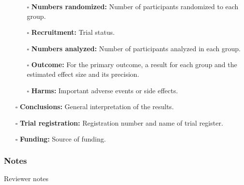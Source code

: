 \documentclass[11pt]{article}
\def\tightlist{}
\begin{document}
\begin{Form}
\begin{itemize}
  \begin{itemize}
  \tightlist
  \item[$\square$]
    \textbf{Numbers randomized:} Number of participants randomized to
    each group.
  \item[$\square$]
    \textbf{Recruitment:} Trial status.
  \item[$\square$]
    \textbf{Numbers analyzed:} Number of participants analyzed in each
    group.
  \item[$\square$]
    \textbf{Outcome:} For the primary outcome, a result for each group
    and the estimated effect size and its precision.
  \item[$\square$]
    \textbf{Harms:} Important adverse events or side effects.
  \end{itemize}
\item[$\square$]
  \textbf{Conclusions:} General interpretation of the results.
\item[$\square$]
  \textbf{Trial registration:} Registration number and name of trial
  register.
\item[$\square$]
  \textbf{Funding:} Source of funding.
\end{itemize}

\subsubsection{Notes}\label{notes}

{Reviewer notes}

\end{Form}
\end{document}
